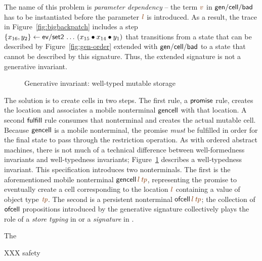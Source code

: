 The name of this problem is {\it parameter dependency} -- the term
$\lf{v}$ in ${\sf gen/cell/bad}$ has to be instantiated before the
parameter $\lf{l}$ is introduced. As a result, the trace in
Figure~\ref{fig:bigbackpatch} includes a step
$\{{x_{16},y_2}\} \leftarrow {{\sf
    ev/set2}\,\ldots\,({x_{15}} \mathbin{\bullet}{{x_{14}} \mathbin{\bullet}{y_1}})}$ that
transitions from a state that can be described by
Figure~\ref{fig:gen-order} extended with ${\sf gen/cell/bad}$ to a
state that cannot be described by this signature. Thus, the extended
signature is not a generative invariant.

\begin{figure}[tp]
\caption{Generative invariant: well-typed mutable storage}
\label{fig:gen-state} 
\end{figure}

The solution is to create cells in two steps. The first rule, a ${\sf
  promise}$ rule, creates the location and associates a mobile
nonterminal ${\sf gencell}$ with that location. A second ${\sf
  fulfill}$ rule consumes that nonterminal and creates the actual
mutable cell.  Because ${\sf gencell}$ is a mobile nonterminal, the
promise {\it must} be fulfilled in order for the final state to pass
through the restriction operation. As with ordered abstract machines,
there is not much of a technical difference between well-formedness
invariants and well-typedness invariants; Figure~\ref{fig:gen-state}
describes a well-typedness invariant. This specification introduces
two nonterminals. The first is the aforementioned mobile nonterminal
${\sf gencell}\,\lf{l}\,\lf{\it tp}$, representing the promise to
eventually create a cell corresponding to the location $\lf{l}$
containing a value of object type $\lf{\it tp}$.  The second is a
persistent nonterminal ${\sf ofcell}\,\lf{l}\,\lf{\it tp}$; the
collection of ${\sf ofcell}$ propositions introduced by the generative
signature collectively plays the role of a {\it store typing} in
\cite[Chapter 13]{pierce02types} or a {\it signature} in \cite[Chapter
35]{harper12practical}.

The 

XXX safety






